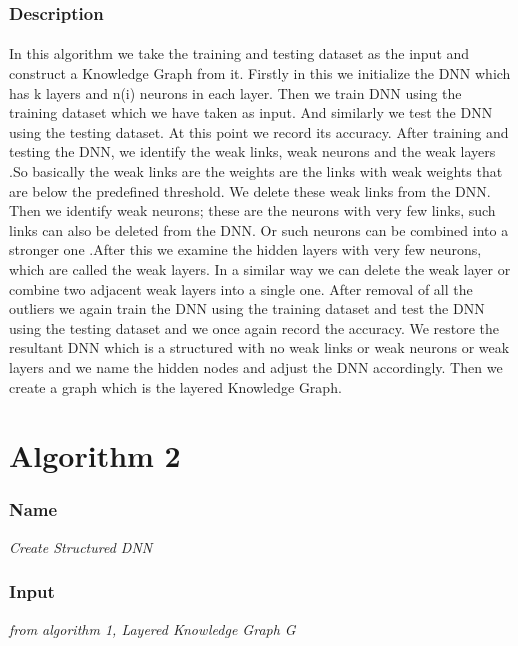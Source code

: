 \documentclass[11pt,fleqn]{book} %
\begin{document}
\subsubsection{Description}
\paragraph*{}
In this algorithm we take the training and testing dataset as the input and construct a Knowledge Graph from it. Firstly in this we initialize the DNN which has k layers and n(i) neurons in each layer.  Then we train DNN using the training dataset which we have taken as input. And similarly we test the DNN using the testing dataset. At this point we record its accuracy. After training and testing the DNN, we identify the weak links, weak neurons and the weak layers .So basically the weak links are the weights are the links with weak weights that are below the predefined threshold. We delete these weak links from the DNN. Then we identify weak neurons; these are the neurons with very few links, such links can also be deleted from the DNN. Or such neurons can be combined into a stronger one .After this we examine the hidden layers with very few neurons, which are called the weak layers. In a similar way we can delete the weak layer or combine two adjacent weak layers into a single one. After removal of all the outliers we again train the DNN using the training dataset and test the DNN using the testing dataset and we once again record the accuracy. We restore the resultant DNN which is a structured with no weak links or weak neurons or weak layers and we name the hidden nodes and adjust the DNN accordingly. Then we create a graph which is the layered Knowledge Graph.

\section{Algorithm 2}
\subsubsection{Name}
\emph{\color{ocre}Create Structured DNN}
\subsubsection{Input}
\emph{from algorithm 1, Layered Knowledge Graph G}
\end{document}

